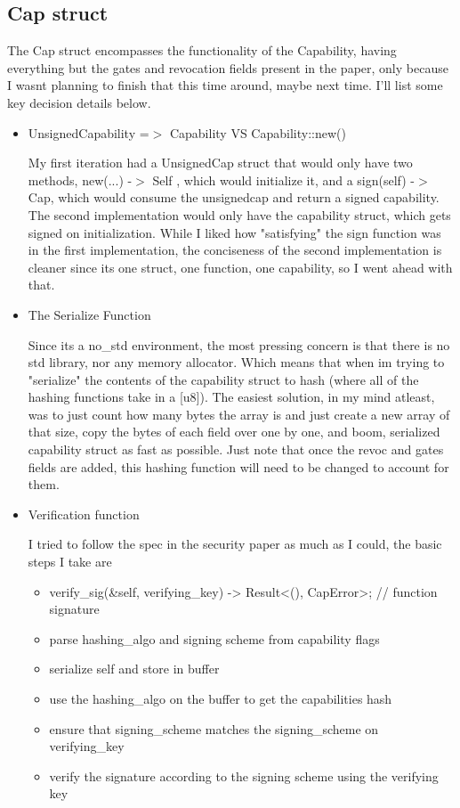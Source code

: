 \documentclass{article}
\begin{document}
\subsection{Cap struct}
The Cap struct encompasses the functionality of the Capability, having
everything but the gates and revocation fields present in the paper, only because
I wasnt planning to finish that this time around, maybe next time. I'll list some
key decision details below.
\begin{itemize}
	\item UnsignedCapability =$>$ Capability VS Capability::new()


	      My first iteration had a UnsignedCap struct that would only have two methods,
	      new(...) -$>$ Self , which would initialize it, and a sign(self) -$>$ Cap, which would consume
	      the unsignedcap and return a signed capability. The second implementation would
	      only have the capability struct, which gets signed on initialization. While
	      I liked how "satisfying" the sign function was in the first implementation,
	      the conciseness of the second implementation is cleaner
	      since its one struct, one function, one capability, so I went ahead with that.

	\item The Serialize Function

	      Since its a no_std environment, the most pressing concern is that there is no
	      std library, nor any memory allocator. Which means that when im trying to
	      "serialize" the contents of the capability struct to hash (where all of
	      the hashing functions take in a [u8]). The easiest solution, in my mind atleast,
	      was to just count how many bytes the array is and just create a new array of that size,
	      copy the bytes of each field over one by one, and boom, serialized capability struct as
	      fast as possible. Just note that once the revoc and gates fields are added, this
	      hashing function will need to be changed to account for them.

	\item Verification function

	      I tried to follow the spec in the security paper as much as I could, the basic steps I take are
	      \begin{itemize}
		      \item verify_sig(\&self, verifying_key) -> Result<(), CapError>; // function signature
		      \item parse hashing_algo and signing scheme from capability flags
		      \item serialize self and store in buffer
		      \item use the hashing_algo on the buffer to get the capabilities hash
		      \item ensure that signing_scheme matches the signing_scheme on verifying_key
		      \item verify the signature according to the signing scheme using the verifying key
	      \end{itemize}


\end{itemize}
\end{document}
